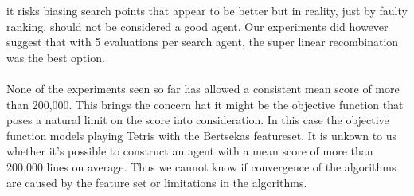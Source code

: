 \begin{changebar}
it risks biasing search points that appear to be better 
but in reality, just by faulty ranking, should
not be considered a good agent. Our experiments 
did however suggest that with 5 evaluations per search agent,
the super linear recombination was the best option.\\
\\
None of the experiments seen so far has allowed a 
consistent mean score of more 
than 200,000. This brings the concern 
hat it might be the objective function
that poses a natural limit on the score into consideration.
In this case the objective function
models playing Tetris with the Bertsekas featureset. 
It is unkown to us
whether it's possible to construct an agent 
with a mean score of more than
200,000 lines on average. 
Thus we cannot know if convergence 
of the algorithms are caused by the feature set or limitations in the
algorithms.
\end{changebar}
